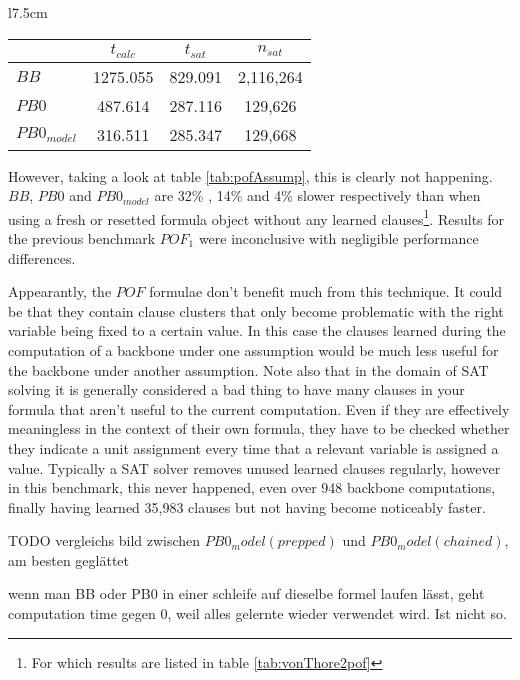 \begin{wraptable}{l}{7.5cm}
\begin{tabular}{l| c c  c}
& $t_{calc}$ & $t_{sat}$ &  $n_{sat}$ \\
\hline
$BB$ & 1275.055 & 829.091 &  2,116,264 \\
$PB0$ & 487.614 & 287.116 &  129,626 \\
$PB0_{model}$ & 316.511 & 285.347 & 129,668 \\
\end{tabular}
\caption{Results with assumptions instead of formula modification}
\label{tab:pofAssump}
\end{wraptable}

However, taking a look at table \ref{tab:pofAssump}, this is clearly not happening. $BB$, $PB0$ and $PB0_{model}$ are 32\% , 14\% and 4\% slower respectively than when using a fresh or resetted formula object without any learned clauses\footnote{For which results are listed in table \ref{tab:vonThore2pof}}. Results for the previous benchmark $POF_1$ were inconclusive with negligible performance differences.

Appearantly, the $POF$ formulae don't benefit much from this technique. It could be that they contain clause clusters that only become problematic with the right variable being fixed to a certain value. In this case the clauses learned during the computation of a backbone under one assumption would be much less useful for the backbone under another assumption. Note also that in the domain of SAT solving it is generally considered a bad thing to have many clauses in your formula that aren't useful to the current computation. Even if they are effectively meaningless in the context of their own formula, they have to be checked whether they indicate a unit assignment every time that a relevant variable is assigned a value. Typically a SAT solver removes unused learned clauses regularly, however in this benchmark, this never happened, even over 948 backbone computations, finally having learned 35,983 clauses but not having become noticeably faster.






\newpage
TODO vergleichs bild zwischen $PB0_model(prepped)$ und $PB0_model(chained)$, am besten geglättet


\iffalse



wenn man BB oder PB0 in einer schleife auf dieselbe formel laufen lässt, geht computation time gegen 0, weil alles gelernte wieder verwendet wird. Ist nicht so.

